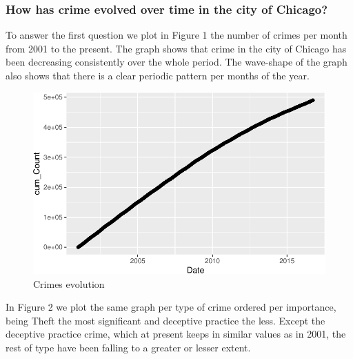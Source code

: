 \documentclass[]{article}
\newenvironment{Shaded}{\begin{snugshade}}{\end{snugshade}}
\newcommand{\KeywordTok}[1]{\textcolor[rgb]{0.13,0.29,0.53}{\textbf{{#1}}}}
\newcommand{\DataTypeTok}[1]{\textcolor[rgb]{0.13,0.29,0.53}{{#1}}}
\newcommand{\StringTok}[1]{\textcolor[rgb]{0.31,0.60,0.02}{{#1}}}
\newcommand{\CommentTok}[1]{\textcolor[rgb]{0.56,0.35,0.01}{\textit{{#1}}}}
\newcommand{\NormalTok}[1]{{#1}}
\begin{document}
\subsubsection{How has crime evolved over time in the city of
Chicago?}\label{how-has-crime-evolved-over-time-in-the-city-of-chicago}

To answer the first question we plot in Figure 1 the number of crimes
per month from 2001 to the present. The graph shows that crime in the
city of Chicago has been decreasing consistently over the whole period.
The wave-shape of the graph also shows that there is a clear periodic
pattern per months of the year.

\begin{Shaded}
\end{Shaded}

\begin{figure}[htbp]
\centering
\includegraphics{Assessment_1v12_files/figure-latex/fig-1.pdf}
\caption{Crimes evolution}
\end{figure}

In Figure 2 we plot the same graph per type of crime ordered per
importance, being Theft the most significant and deceptive practice the
less. Except the deceptive practice crime, which at present keeps in
similar values as in 2001, the rest of type have been falling to a
greater or lesser extent.
\end{document}
